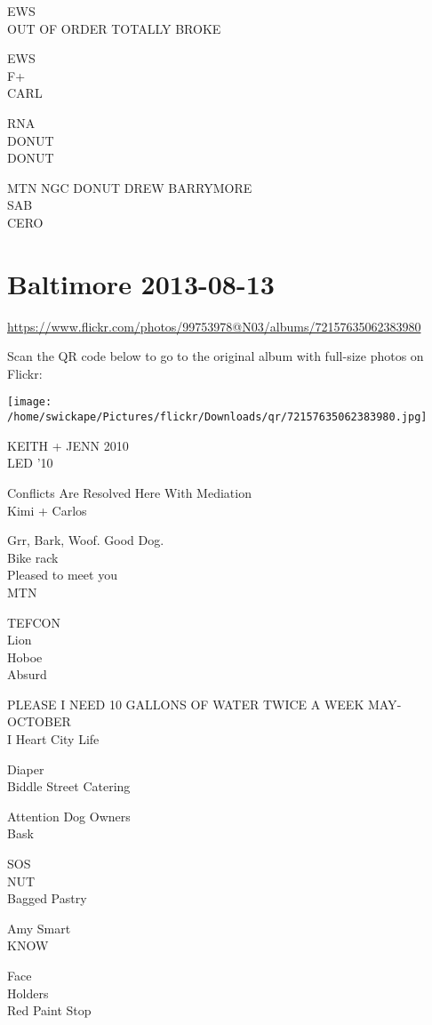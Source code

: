 \documentclass[10pt,letterpaper]{article}
\begin{document}
EWS\\
OUT OF ORDER TOTALLY BROKE

EWS\\
F+\\
CARL

RNA\\
DONUT\\
DONUT

MTN NGC DONUT DREW BARRYMORE\\
SAB\\
CERO


\section*{Baltimore 2013-08-13}

\url{https://www.flickr.com/photos/99753978@N03/albums/72157635062383980}

Scan the QR code below to go to the original album with full-size photos on Flickr:

\texttt{[image: /home/swickape/Pictures/flickr/Downloads/qr/72157635062383980.jpg]}


KEITH + JENN 2010\\
LED '10

Conflicts Are Resolved Here With Mediation\\
Kimi + Carlos

Grr, Bark, Woof.  Good Dog.\\
Bike rack\\
Pleased to meet you\\
MTN

TEFCON\\
Lion\\
Hoboe\\
Absurd

PLEASE I NEED 10 GALLONS OF WATER TWICE A WEEK MAY{-}OCTOBER\\
I Heart City Life

Diaper\\
Biddle Street Catering

Attention Dog Owners\\
Bask

SOS\\
NUT\\
Bagged Pastry

Amy Smart\\
KNOW

Face\\
Holders\\
Red Paint Stop
\end{document}
